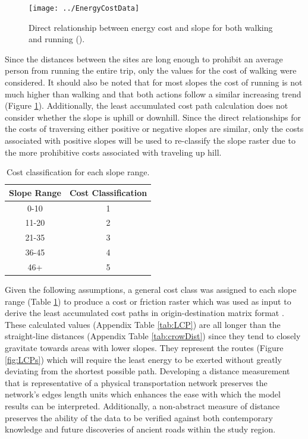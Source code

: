 \documentclass[12pt,a4paper]{thesis}
\begin{document}
\begin{figure}
\centering
\texttt{[image: ../EnergyCostData]}
\caption{Direct relationship between energy cost and slope for both walking and running (\citep{Min02}).}
\label{fig:EnergyCostData}
\end{figure}



Since the distances between the sites are long enough to prohibit an average person from running the entire trip, only the values for the cost of walking were considered. It should also be noted that for most slopes the cost of running is not much higher than walking and that both actions follow a similar increasing trend (Figure \ref{fig:EnergyCostData}). Additionally, the least accumulated cost path calculation does not consider whether the slope is uphill or downhill. Since the direct relationships for the costs of traversing either positive or negative slopes are similar, only the costs associated with positive slopes will be used to re-classify the slope raster due to the more prohibitive costs associated with traveling up hill. 

\begin{table}
\centering
\caption{Cost classification for each slope range.}
\begin{tabular}{|c|c|}
\hline Slope Range & Cost Classification \\ 
\hline 0-10 & 1 \\ 
\hline 11-20 & 2 \\ 
\hline 21-35 & 3 \\ 
\hline 36-45 & 4 \\ 
\hline 46+ & 5 \\ 
\hline 
\end{tabular} 
\label{tab:slopeClass}
\end{table}

Given the following assumptions, a general cost class was assigned to each slope range (Table \ref{tab:slopeClass}) to produce a cost or friction raster which was used as input to derive the least accumulated cost paths in origin-destination matrix format \citep{Eth11}. These calculated values (Appendix Table \ref{tab:LCP}) are all longer than the straight-line distances (Appendix Table \ref{tab:crowDist}) since they tend to closely gravitate towards areas with lower slopes. They represent the routes (Figure \ref{fig:LCPs}) which will require the least energy to be exerted without greatly deviating from the shortest possible path. Developing a distance measurement that is representative of a physical transportation network preserves the network's edges length units which enhances the ease with which the model results can be interpreted. Additionally, a non-abstract measure of distance preserves the ability of the data to be verified against both contemporary knowledge and future discoveries of ancient roads within the study region.
\end{document}
